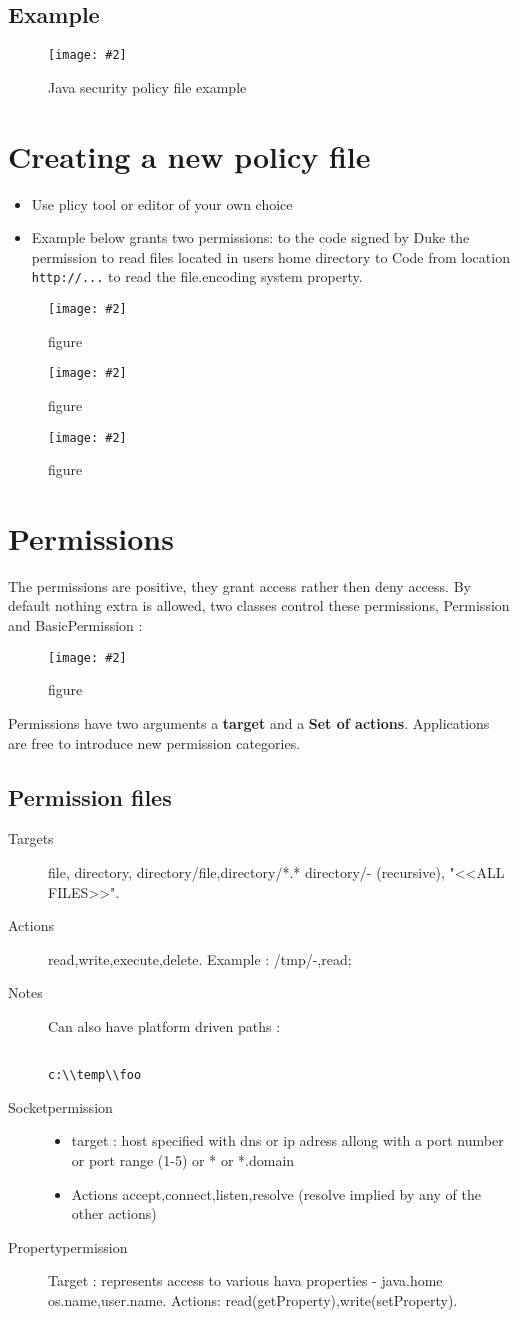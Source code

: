 \documentclass[a4paper,10pt]{scrreprt}
\newcommand{\pic}[2][figure]{\begin{figure}[h]
 \centering
 \texttt{[image: \#2]}
 \caption{#1}
\end{figure}
}
\begin{document}
\subsection{Example}
\pic[Java security policy file example]{jspe.png}

\section{Creating a new policy file}
 \begin{itemize}
  \item Use plicy tool or editor of your own choice
  \item Example below grants two permissions:
  \subitem to the code signed by Duke the permission to read files located in users home directory
  \subitem to Code from location \texttt{http://...} to read the file.encoding system property.
 \end{itemize}
\pic{polex.png}
\pic{polex2.png}
\pic{polex3.png}

\section{Permissions}
The permissions are positive, they grant access rather then deny access. By default nothing extra is allowed, two 
classes control these permissions, Permission and BasicPermission :
\pic{ptree.png}

Permissions have two arguments a \textbf{target} and a \textbf{Set of actions}. Applications are free to introduce new 
permission categories. 

\subsection{Permission files}
\begin{description}
 \item [Targets] file, directory, directory/file,directory/*.* directory/- (recursive), "<<ALL FILES>>".
 \item [Actions] read,write,execute,delete. Example : /tmp/-,read;
 \item [Notes] Can also have platform driven paths : \begin{verbatim}
                                                      c:\\temp\\foo
                                                     \end{verbatim}
\item[Socketpermission] \begin{itemize}
                         \item target : host specified with dns or ip adress allong with a port number or port range 
(1-5) or * or *.domain
\item Actions accept,connect,listen,resolve (resolve implied by any of the other actions)
                        \end{itemize}
 \item[Propertypermission] Target : represents access to various hava properties - java.home os.name,user.name. 
Actions: read(getProperty),write(setProperty).
\end{description}
\end{document}
